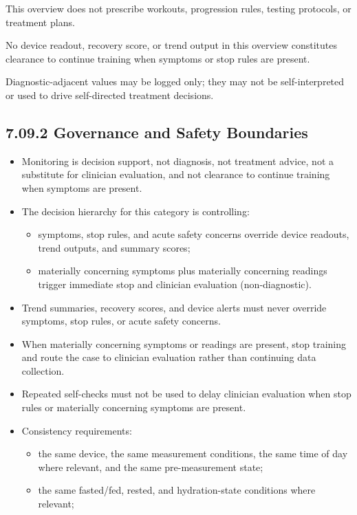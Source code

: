 \documentclass[10pt]{article}
\begin{document}
This overview does not prescribe workouts, progression rules, testing protocols, or treatment plans.

No device readout, recovery score, or trend output in this overview constitutes clearance to continue training when symptoms or stop rules are present.

Diagnostic-adjacent values may be logged only; they may not be self-interpreted or used to drive self-directed treatment decisions.

\subsection*{7.09.2 Governance and Safety Boundaries}
{}

\begin{itemize}
\item Monitoring is decision support, not diagnosis, not treatment advice, not a substitute for clinician evaluation, and not clearance to continue training when symptoms are present.
\item The decision hierarchy for this category is controlling:
  \begin{itemize}
  \item symptoms, stop rules, and acute safety concerns override device readouts, trend outputs, and summary scores;
  \item materially concerning symptoms plus materially concerning readings trigger immediate stop and clinician evaluation (non-diagnostic).
  \end{itemize}
\item Trend summaries, recovery scores, and device alerts must never override symptoms, stop rules, or acute safety concerns.
\item When materially concerning symptoms or readings are present, stop training and route the case to clinician evaluation rather than continuing data collection.
\item Repeated self-checks must not be used to delay clinician evaluation when stop rules or materially concerning symptoms are present.
\item Consistency requirements:
  \begin{itemize}
  \item the same device, the same measurement conditions, the same time of day where relevant, and the same pre-measurement state;
  \item the same fasted/fed, rested, and hydration-state conditions where relevant;

\end{itemize}
\end{itemize}
\end{document}
